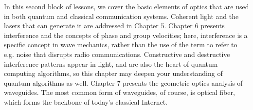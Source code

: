 
\begin{partintro}

In this second block of lessons, we cover the basic elements of optics that are used in both quantum and classical communication systems. Coherent light and the lasers that can generate it are addressed in Chapter 5. Chapter 6 presents interference and the concepts of phase and group velocities; here, interference is a specific concept in wave mechanics, rather than the use of the term to refer to e.g. noise that disrupts radio communications. Constructive and destructive interference patterns appear in light, and are also the heart of quantum computing algorithms, so this chapter may deepen your understanding of quantum algorithms as well.  Chapter 7 presents the geometric optics analysis of waveguides.  The most common form of waveguides, of course, is optical fiber, which forms the backbone of today's classical Internet.
\end{partintro}
